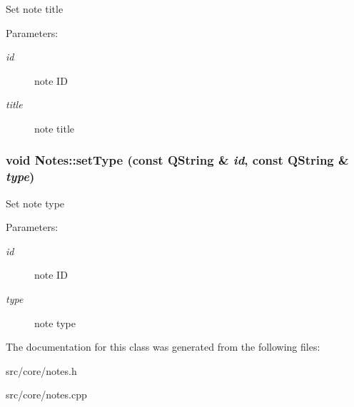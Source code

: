 Set note title \begin{Desc}
\item[Parameters:]
\begin{description}
\item[{\em id}]note ID \item[{\em title}]note title \end{description}
\end{Desc}
\hypertarget{classNotes_2e471d6614087c21ad4265596387312c}{
\subsubsection[{setType}]{\setlength{\rightskip}{0pt plus 5cm}void Notes::setType (const QString \& {\em id}, \/  const QString \& {\em type})}}
\label{classNotes_2e471d6614087c21ad4265596387312c}


Set note type \begin{Desc}
\item[Parameters:]
\begin{description}
\item[{\em id}]note ID \item[{\em type}]note type \end{description}
\end{Desc}


The documentation for this class was generated from the following files:\begin{CompactItemize}
\item 
src/core/notes.h\item 
src/core/notes.cpp\end{CompactItemize}
